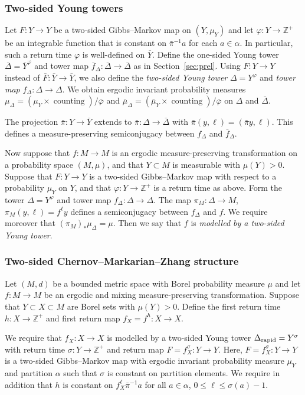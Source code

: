 \documentclass[AHL,Unicode,longabstracts,published]{cedram}
\newcommand{\Z}{\mathbb{Z}}
\DeclareMathOperator{\counting}{counting}
\newcommand{\DE}{\Delta_{\rm rapid}}
\newcommand{\bY}{\bar{Y}}
\newcommand{\bF}{\bar{F}}
\newcommand{\bvarphi}{\bar{\varphi}}
\begin{document}
\subsubsection*{Two-sided Young towers}
Let $F:Y\to Y$ be a two-sided Gibbs--Markov map on $(Y,\mu_Y)$ and let $\varphi:Y\to\Z^+$ be an integrable function that is constant on $\bar\pi^{-1}a$ for each $a\in\alpha$. In particular, such a return time $\varphi$ is well-defined on $\bY$. Define the one-sided Young tower $\bar\Delta=\bY^\varphi$ and tower map $\bar f_\Delta:\bar\Delta\to\bar\Delta$ as in Section~\ref{sec:prel}. Using $F:Y\to Y$ instead of $\bF:\bY\to\bY$, we also define the \emph{two-sided Young tower} $\Delta=Y^\varphi$ and \emph{tower map} $f_\Delta:\Delta\to\Delta$. We obtain ergodic invariant probability measures $\mu_\Delta=(\mu_Y\times\counting)/\bvarphi$ and $\bar\mu_\Delta=(\bar\mu_Y\times\counting)/\bvarphi$ on $\Delta$ and $\bar\Delta$.

The projection $\bar\pi:Y\to\bY$ extends to $\bar\pi:\Delta\to\bar\Delta$ with $\bar\pi(y,\ell)=(\bar\pi y,\ell)$. This defines a measure-preserving semiconjugacy between $f_\Delta$ and $\bar f_\Delta$.

Now suppose that $f:M\to M$ is an ergodic measure-preserving transformation on a probability space $(M,\mu)$, and that $Y\subset M$ is measurable with $\mu(Y)>0$. Suppose that $F:Y\to Y$ is a two-sided Gibbs--Markov map with respect to a probability $\mu_Y$ on $Y$, and that $\varphi:Y\to\Z^+$ is a return time as above. Form the tower $\Delta=Y^\varphi$ and tower map $f_\Delta:\Delta\to\Delta$. The map $\pi_M:\Delta\to M$, $\pi_M(y,\ell)=f^\ell y$ defines a semiconjugacy between $f_\Delta$ and $f$. We require moreover that $(\pi_M)_*\mu_\Delta=\mu$. Then we say that $f$ is \emph{modelled by a two-sided Young tower}.


\subsubsection*{Two-sided Chernov--Markarian--Zhang structure}
Let $(M,d)$ be a bounded metric space with Borel probability measure $\mu$ and let $f:M\to M$ be an ergodic and mixing measure-preserving transformation. Suppose that $Y\subset X\subset M$ are Borel sets with $\mu(Y)>0$. Define the first return time $h:X\to\Z^+$ and first return map $f_X=f^h:X\to X$.

We require that $f_X:X\to X$ is modelled by a two-sided Young tower $\DE=Y^\sigma$ with return time $\sigma:Y\to\Z^+$ and return map $F=f_X^\sigma:Y\to Y$. Here, $F=f_X^\sigma:Y\to Y$ is a two-sided Gibbs--Markov map with ergodic invariant probability measure $\mu_Y$ and partition $\alpha$ such that $\sigma$ is constant on partition elements. We require in addition that $h$ is constant on $f_X^\ell \bar\pi^{-1}a$ for all $a\in\alpha$, $0\le\ell\le\sigma(a)-1$.
\end{document}
